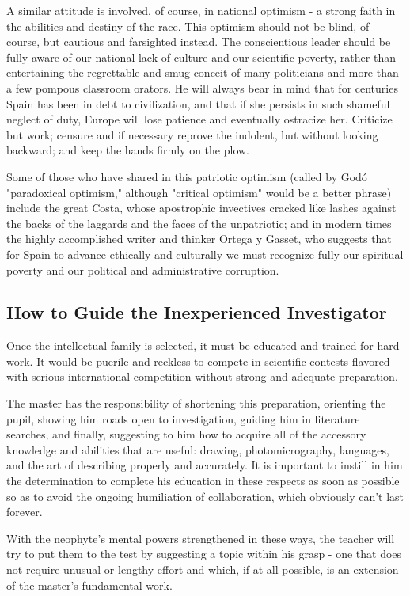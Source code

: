 \documentclass{article}
\begin{document}
A similar attitude is involved, of course, in national optimism - a strong faith in the abilities and destiny of the race. This optimism should not be blind, of course, but cautious and farsighted instead. The conscientious leader should be fully aware of our national lack of culture and our scientific poverty, rather than entertaining the regrettable and smug conceit of many politicians and more than a few pompous classroom orators. He will always bear in mind that for centuries Spain has been in debt to civilization, and that if she persists in such shameful neglect of duty, Europe will lose patience and eventually ostracize her. Criticize but work; censure and if necessary reprove the indolent, but without looking backward; and keep the hands firmly on the plow.

Some of those who have shared in this patriotic optimism (called by Godó "paradoxical optimism," although "critical optimism" would be a better phrase) include the great Costa, whose apostrophic invectives cracked like lashes against the backs of the laggards and the faces of the unpatriotic; and in modern times the highly accomplished writer and thinker Ortega y Gasset, who suggests that for Spain to advance ethically and culturally we must recognize fully our spiritual poverty and our political and administrative corruption.

\subsection*{How to Guide the Inexperienced Investigator}

Once the intellectual family is selected, it must be educated and trained for hard work. It would be puerile and reckless to compete in scientific contests flavored with serious international competition without strong and adequate preparation.

The master has the responsibility of shortening this preparation, orienting the pupil, showing him roads open to investigation, guiding him in literature searches, and finally, suggesting to him how to acquire all of the accessory knowledge and abilities that are useful: drawing, photomicrography, languages, and the art of describing properly and accurately. It is important to instill in him the determination to complete his education in these respects as soon as possible so as to avoid the ongoing humiliation of collaboration, which obviously can’t last forever.

With the neophyte’s mental powers strengthened in these ways, the teacher will try to put them to the test by suggesting a topic within his grasp - one that does not require unusual or lengthy effort and which, if at all possible, is an extension of the master’s fundamental work.
\end{document}
